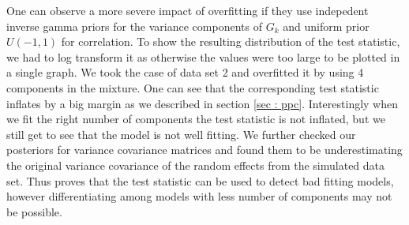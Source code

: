 One can observe a more severe impact of overfitting if they use indepedent inverse gamma priors for the variance components of $G_k$ and uniform prior $U(-1,1)$ for correlation. To show the resulting distribution of the test statistic, we had to log transform it as otherwise the values were too large to be plotted in a single graph. We took the case of data set 2 and overfitted it by using 4 components in the mixture. One can see that the corresponding test statistic inflates by a big margin as we described in section \ref{sec : ppc}. Interestingly when we fit the right number of components the test statistic is not inflated, but we still get to see that the model is not well fitting. We further checked our posteriors for variance covariance matrices and found them to be underestimating the original variance covariance of the random effects from the simulated data set. Thus proves that the test statistic can be used to detect bad fitting models, however differentiating among models with less number of components may not be possible.

